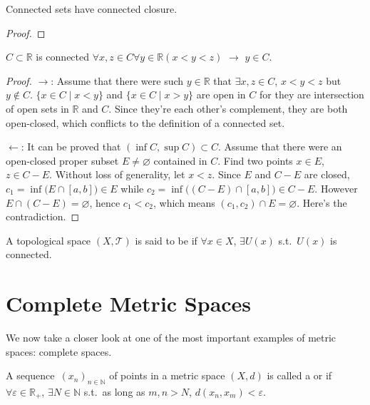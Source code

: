 \documentclass[openany]{book}
\begin{document}
\begin{theorem}\label{theorem: closure of connected set}
	Connected sets have connected closure.
\end{theorem}
\begin{proof}
\end{proof}


\begin{theorem}\label{theorem: real connected sets}
	$C \subset \mathbb R$ is connected   $\forall x, z \in C \forall y \in \mathbb R (x < y < z)$  $\to $ $y \in C$.
\end{theorem}
\begin{proof}
	$\to$:
	Assume that there were such $y \in \mathbb R$ that $\exists x, z \in C$, $x < y < z$ but $y \notin C$. 
	$\{x \in C \mid x < y\}$ and $\{x \in C \mid x > y\}$ are open in $C$ for they are intersection of open sets in $\mathbb R$ and $C$. 
	Since they're each other's complement, they are both open-closed, which conflicts to the definition of a connected set.
	
	$\gets$: 
	It can be proved that $(\inf C, \sup C) \subset C$. 
	Assume that there were an open-closed proper subset $E \neq \varnothing$ contained in $C$. 
	Find two points $x \in E$, $z \in C - E$. 
	Without loss of generality, let $x < z$. 
	Since $E$ and $C - E$ are closed, $c_1 = \inf \big( E \cap [a,b] \big) \in E$ while $c_2 = \inf \big((C - E) \cap [a, b]\big) \in C - E$. 
	However $E \cap (C - E) = \varnothing$, hence $c_1 < c_2$, which means $(c_1, c_2) \cap E = \varnothing$. 
	Here's the contradiction.
\end{proof}

\begin{definition}\label{definition: locally connected}
	A topological space $(X, \mathscr T)$ is said to be  if $\forall x \in X$, $\exists U(x) $ s.t.\ $U(x)$ is connected.
\end{definition}

\section{Complete Metric Spaces}
We now take a closer look at one of the most important examples of metric spaces: complete spaces.

\begin{definition}\label{definition: Cauchy sequence}
	A sequence~$(x_n)_{n \in \mathbb N}$ of points in a metric space $(X, d)$ is called a  or  if $\forall \varepsilon \in \mathbb R_+$, $\exists N \in \mathbb N$ s.t.\ as long as $m, n > N$, $d(x_n, x_m) < \varepsilon$.
\end{definition}
\end{document}
